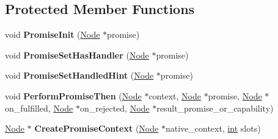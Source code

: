 \subsection*{Protected Member Functions}
\begin{DoxyCompactItemize}
\item 
\mbox{\label{classv8_1_1internal_1_1PromiseBuiltinsAssembler_a1c6cda4f9934236e35247c99189c3401}} 
void {\bfseries Promise\+Init} (\mbox{\hyperlink{classv8_1_1internal_1_1compiler_1_1Node}{Node}} $\ast$promise)
\item 
\mbox{\label{classv8_1_1internal_1_1PromiseBuiltinsAssembler_ab949652bc52be62da64b8e04a8b38488}} 
void {\bfseries Promise\+Set\+Has\+Handler} (\mbox{\hyperlink{classv8_1_1internal_1_1compiler_1_1Node}{Node}} $\ast$promise)
\item 
\mbox{\label{classv8_1_1internal_1_1PromiseBuiltinsAssembler_a0d09c3adccdc738bafc4a1fdc8eeb5b8}} 
void {\bfseries Promise\+Set\+Handled\+Hint} (\mbox{\hyperlink{classv8_1_1internal_1_1compiler_1_1Node}{Node}} $\ast$promise)
\item 
\mbox{\label{classv8_1_1internal_1_1PromiseBuiltinsAssembler_a316d72dbbcd5c9bda5ff4252688775e2}} 
void {\bfseries Perform\+Promise\+Then} (\mbox{\hyperlink{classv8_1_1internal_1_1compiler_1_1Node}{Node}} $\ast$context, \mbox{\hyperlink{classv8_1_1internal_1_1compiler_1_1Node}{Node}} $\ast$promise, \mbox{\hyperlink{classv8_1_1internal_1_1compiler_1_1Node}{Node}} $\ast$on\+\_\+fulfilled, \mbox{\hyperlink{classv8_1_1internal_1_1compiler_1_1Node}{Node}} $\ast$on\+\_\+rejected, \mbox{\hyperlink{classv8_1_1internal_1_1compiler_1_1Node}{Node}} $\ast$result\+\_\+promise\+\_\+or\+\_\+capability)
\item 
\mbox{\label{classv8_1_1internal_1_1PromiseBuiltinsAssembler_aac05ef13537c677cfb397559521d11e5}} 
\mbox{\hyperlink{classv8_1_1internal_1_1compiler_1_1Node}{Node}} $\ast$ {\bfseries Create\+Promise\+Context} (\mbox{\hyperlink{classv8_1_1internal_1_1compiler_1_1Node}{Node}} $\ast$native\+\_\+context, \mbox{\hyperlink{classint}{int}} slots)
\item 

\end{DoxyCompactItemize}
